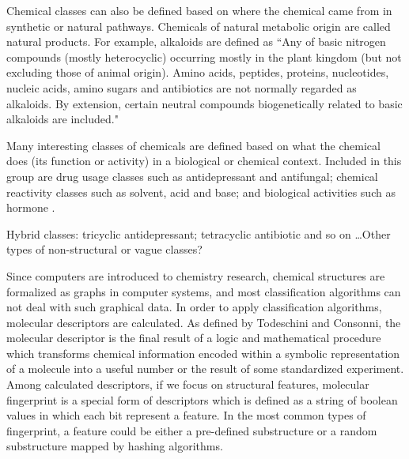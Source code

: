 \documentclass[10pt]{bmc_article}
\newenvironment{bmcformat}{\baselineskip20pt\sloppy\setboolean{publ}{false}}{\baselineskip20pt\sloppy}
\begin{document}
\begin{bmcformat}
Chemical classes can also be defined based on where the chemical came from in synthetic or natural pathways. Chemicals of natural metabolic origin are called natural products.  For example, alkaloids are defined as ``Any of basic nitrogen compounds (mostly heterocyclic) occurring mostly in the plant kingdom (but not excluding those of animal origin). Amino acids, peptides, proteins, nucleotides, nucleic acids, amino sugars and antibiotics are not normally regarded as alkaloids. By extension, certain neutral compounds biogenetically related to basic alkaloids are included."

Many interesting classes of chemicals are defined based on what the chemical does (its function or activity) in a biological or chemical context. Included in this group are drug usage classes such as antidepressant and antifungal; chemical reactivity classes such as solvent, acid and base; and biological activities such as hormone \cite{batchelor2010}. 


Hybrid classes:  tricyclic antidepressant; tetracyclic antibiotic and so on \ldots  Other types of non-structural or vague classes? 


Since computers are introduced to chemistry research, chemical structures are formalized as graphs in computer systems, and most classification algorithms can not deal with such graphical data. In order to apply classification algorithms, molecular descriptors are calculated. As defined by Todeschini and Consonni\cite{Todeschini2000}, the molecular descriptor is the final result of a logic and mathematical procedure which transforms chemical information encoded within a symbolic representation of a molecule into a useful number or the result of some standardized experiment. Among calculated descriptors, if we focus on structural features, molecular fingerprint is a special form of descriptors which is defined as a string of boolean values in which each bit represent a feature. In the most common types of fingerprint, a feature could be either a pre-defined substructure or a random substructure mapped by hashing algorithms.


\end{bmcformat}
\end{document}

